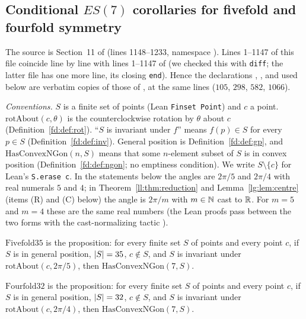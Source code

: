 \subsection{Conditional \texorpdfstring{$ES(7)$}{ES(7)} corollaries for fivefold and fourfold symmetry}\label{ec:ssec:es7}

The source is Section~11 of  (lines 1148--1233, namespace
). Lines 1--1147 of this file coincide line by line with lines 1--1147 of
 (we checked this with \texttt{diff}; the latter file has one more line, its closing
\texttt{end}). Hence the declarations , ,  and
 used below are verbatim copies of those of , at the same
lines ($105$, $298$, $582$, $1066$).

\emph{Conventions.} $S$ is a finite set of points (Lean \texttt{Finset Point}) and $c$ a point. $\mathrm{rotAbout}(c,\theta)$
is the counterclockwise rotation by $\theta$ about $c$ (Definition~\ref{fd:def:rot}). ``$S$ is invariant under $f$''
means $f(p)\in S$ for every $p\in S$ (Definition~\ref{fd:def:inv}). General position is
Definition~\ref{fd:def:gp}, and $\mathrm{HasConvexNGon}(n,S)$ means that some $n$-element subset of $S$ is in convex
position (Definition~\ref{fd:def:ngon}; no emptiness condition). We write $S\setminus\{c\}$ for Lean's
\texttt{S.erase c}. In the statements below the angles are $2\pi/5$ and $2\pi/4$ with real numerals $5$ and $4$; in
Theorem~\ref{ll:thm:reduction} and Lemma~\ref{lg:lem:centre} (items (R) and (C) below) the angle is $2\pi/m$ with
$m\in\mathbb N$ cast to $\mathbb R$. For $m=5$ and $m=4$ these are the same real numbers (the Lean proofs pass between the two forms
with the cast-normalizing tactic ).

\begin{definition}\label{ec:def:cases}
$\mathrm{Fivefold35}$ is the proposition: for every finite set $S$ of points and every point $c$, if $S$ is in
general position, $\lvert S\rvert=35$, $c\notin S$, and $S$ is invariant under $\mathrm{rotAbout}(c,2\pi/5)$, then
$\mathrm{HasConvexNGon}(7,S)$.

$\mathrm{Fourfold32}$ is the proposition: for every finite set $S$ of points and every point $c$, if $S$ is in general
position, $\lvert S\rvert=32$, $c\notin S$, and $S$ is invariant under $\mathrm{rotAbout}(c,2\pi/4)$, then
$\mathrm{HasConvexNGon}(7,S)$.
\end{definition}

